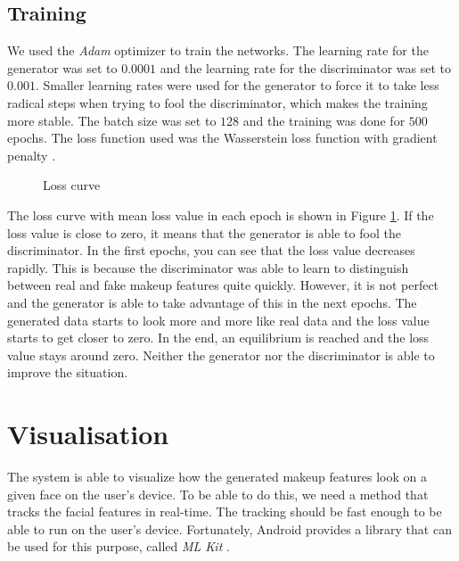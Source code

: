 \documentclass[conference]{IEEEtran}
\begin{document}
\subsection{Training}

We used the \emph{Adam} optimizer \cite{kingma2017adam} to train the networks.
The learning rate for the generator was set to $0.0001$ and the learning rate for the discriminator was set to $0.001$.
Smaller learning rates were used for the generator to force it to take less radical steps when trying to fool the discriminator, which makes the training more stable.
The batch size was set to $128$ and the training was done for $500$ epochs.
The loss function used was the Wasserstein loss function with gradient penalty \cite{gulrajani2017improved}.

\begin{figure}
    \centering 
    \vspace{2mm}
    \caption{Loss curve}
    \label{fig:loss_curve}
\end{figure}

The loss curve with mean loss value in each epoch is shown in Figure \ref{fig:loss_curve}.
If the loss value is close to zero, it means that the generator is able to fool the discriminator.
In the first epochs, you can see that the loss value decreases rapidly.
This is because the discriminator was able to learn to distinguish between real and fake makeup features quite quickly.
However, it is not perfect and the generator is able to take advantage of this in the next epochs.
The generated data starts to look more and more like real data and the loss value starts to get closer to zero.
In the end, an equilibrium is reached and the loss value stays around zero.
Neither the generator nor the discriminator is able to improve the situation.

\section{Visualisation} \label{sec:visualisation}

The system is able to visualize how the generated makeup features look on a given face on the user's device.
To be able to do this, we need a method that tracks the facial features in real-time.
The tracking should be fast enough to be able to run on the user's device.
Fortunately, Android provides a library that can be used for this purpose, called \emph{ML Kit} \cite{mlkit}.
\end{document}
